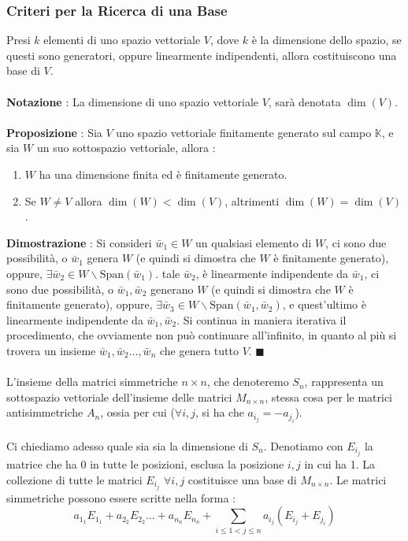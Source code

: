 \documentclass[12pt, letterpaper]{article}
\newcommand{\acc}{\\\hphantom{}\\}
\newcommand{\Span}{{\text{Span}}}
\begin{document}
\subsubsection{Criteri per la Ricerca di una Base}
Presi \(k\) elementi di uno spazio vettoriale \(V\), dove \(k\) è la 
dimensione dello spazio, se questi sono generatori, oppure linearmente indipendenti, 
allora costituiscono una base di \(V\).\acc 
\textbf{Notazione }: La dimensione di uno spazio vettoriale \(V\), sarà denotata \(\dim(V)\).
\acc
\textbf{Proposizione }: Sia \(V\) uno spazio vettoriale finitamente 
generato sul campo \(\mathbb{K}\), e sia \(W\) un suo 
sottospazio vettoriale, allora : \begin{enumerate}
    \item \(W\) ha una dimensione finita ed è finitamente generato. 
    \item Se \(W\ne V\) allora \(\dim(W)<\dim(V)\), altrimenti \(\dim(W)=\dim(V)\).
\end{enumerate}
\textbf{Dimostrazione} : Si consideri \(\bar w_1\in W\) un qualsiasi elemento di \(W\), ci sono due 
possibilità, o \(\bar w_1\) genera \(W\) (e quindi si dimostra che \(W\) è finitamente 
generato), oppure, \(\exists \bar w_2 \in W\backslash\Span(\bar w_1)\). tale \(\bar w_2\), è linearmente 
indipendente da \(\bar w_1\), ci sono due possibilità, o \(\bar w_1,\bar w_2\) generano \(W\) (e quindi si dimostra che \(W\) è finitamente 
generato), oppure, \(\exists \bar w_3 \in W\backslash\Span(\bar w_1,\bar w_2)\), e quest'ultimo è linearmente 
indipendente da \(\bar w_1,\bar w_2\). Si continua in maniera iterativa il procedimento, che ovviamente 
non può continuare all'infinito, in quanto al più si trovera un insieme \(\bar w_1,\bar w_2\dots,\bar w_n\) che 
genera tutto \(V\). \(\blacksquare\) \acc 
L'insieme della matrici simmetriche \(n\times n\), che denoteremo \(S_n\), rappresenta un sottospazio vettoriale 
dell'insieme delle matrici \(M_{n\times n}\), stessa cosa per le matrici antisimmetriche \(A_n\), ossia 
per cui (\(\forall i,j\), si ha che \(a_{i_j}=-a_{j_i}\)). 
\acc Ci chiediamo adesso quale sia sia la dimensione di \(S_n\). Denotiamo con \(E_{i_j}\) la matrice che 
ha 0 in tutte le posizioni, esclusa la posizione \(i,j\) in cui ha 1. La collezione di tutte le 
matrici \(E_{i_j}\) \(\forall i,j\) costituisce una base di \(M_{n\times n}\). Le matrici simmetriche 
possono essere scritte nella forma : \begin{equation}
    a_{1_1}E_{1_1}+a_{2_2}E_{2_2}\dots+a_{n_n}E_{n_n}+\sum_{i\le1<j\le n}a_{i_j}(E_{i_j}+E_{j_i})
\end{equation}
\end{document}
